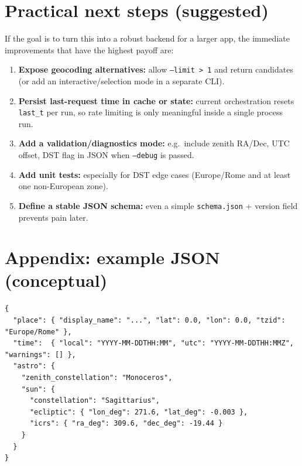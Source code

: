 \documentclass[11pt,a4paper]{article}
\begin{document}
\section{Practical next steps (suggested)}
If the goal is to turn this into a robust backend for a larger app, the immediate improvements that
have the highest payoff are:
\begin{enumerate}[label=\arabic*.]
  \item \textbf{Expose geocoding alternatives:} allow \texttt{--limit > 1} and return candidates
        (or add an interactive/selection mode in a separate CLI).
  \item \textbf{Persist last-request time in cache or state:} current orchestration resets \texttt{last\_t} per run,
        so rate limiting is only meaningful inside a single process run.
  \item \textbf{Add a validation/diagnostics mode:} e.g.\ include zenith RA/Dec, UTC offset, DST flag in JSON when
        \texttt{--debug} is passed.
  \item \textbf{Add unit tests:} especially for DST edge cases (Europe/Rome and at least one non-European zone).
  \item \textbf{Define a stable JSON schema:} even a simple \texttt{schema.json} + version field prevents pain later.
\end{enumerate}

\section{Appendix: example JSON (conceptual)}
\begin{lstlisting}[style=python]
{
  "place": { "display_name": "...", "lat": 0.0, "lon": 0.0, "tzid": "Europe/Rome" },
  "time":  { "local": "YYYY-MM-DDTHH:MM", "utc": "YYYY-MM-DDTHH:MMZ", "warnings": [] },
  "astro": {
    "zenith_constellation": "Monoceros",
    "sun": {
      "constellation": "Sagittarius",
      "ecliptic": { "lon_deg": 271.6, "lat_deg": -0.003 },
      "icrs": { "ra_deg": 309.6, "dec_deg": -19.44 }
    }
  }
}
\end{lstlisting}
\end{document}
